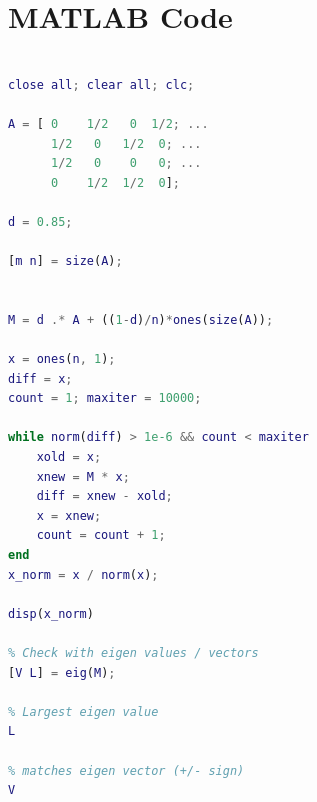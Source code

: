 \documentclass[12pt,letterpaper]{article}
\begin{document}
\newpage
\section*{MATLAB Code}
\begin{lstlisting}[language = Matlab]
%% Adjacency Solver

close all; clear all; clc;

A = [ 0    1/2   0  1/2; ...
      1/2   0   1/2  0; ...
      1/2   0    0   0; ...
      0    1/2  1/2  0];

d = 0.85;

[m n] = size(A);


M = d .* A + ((1-d)/n)*ones(size(A));

x = ones(n, 1);
diff = x;
count = 1; maxiter = 10000;

while norm(diff) > 1e-6 && count < maxiter
    xold = x;
    xnew = M * x;
    diff = xnew - xold;
    x = xnew;
    count = count + 1;
end
x_norm = x / norm(x);

disp(x_norm)

% Check with eigen values / vectors
[V L] = eig(M);

% Largest eigen value
L

% matches eigen vector (+/- sign)
V
\end{lstlisting}
\end{document}

